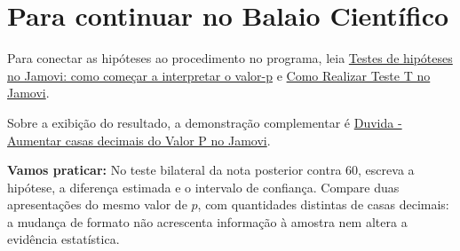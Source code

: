 \section{Para continuar no Balaio Científico}

Para conectar as hipóteses ao procedimento no programa, leia \href{https://www.balaiocientifico.com/2026/10/testes-de-hipoteses-no-jamovi-como.html}{Testes de hipóteses no Jamovi: como começar a interpretar o valor-p} e \href{https://www.balaiocientifico.com/2024/07/como-realizar-teste-t-no-jamovi.html}{Como Realizar Teste T no Jamovi}.

Sobre a exibição do resultado, a demonstração complementar é \href{https://www.youtube.com/watch?v=IG0fWWklM3A}{Duvida - Aumentar casas decimais do Valor P no Jamovi}.

\textbf{Vamos praticar:} No teste bilateral da nota posterior contra 60, escreva a hipótese, a diferença estimada e o intervalo de confiança. Compare duas apresentações do mesmo valor de $p$, com quantidades distintas de casas decimais: a mudança de formato não acrescenta informação à amostra nem altera a evidência estatística.
